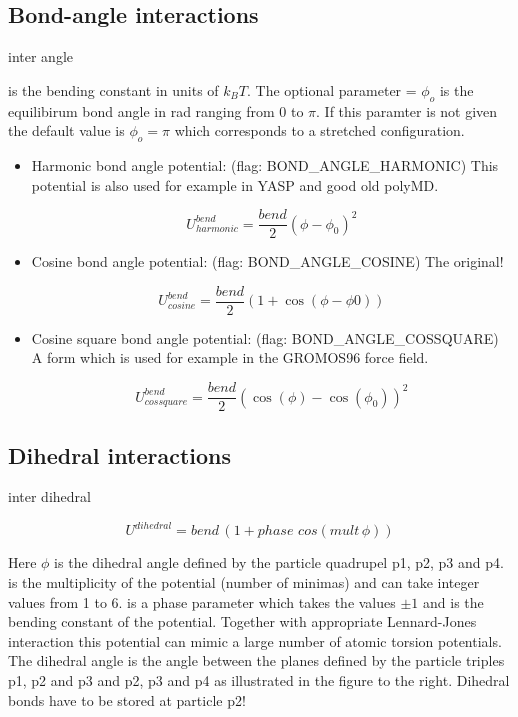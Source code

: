 \subsection{Bond-angle interactions}

\begin{essyntax}
  inter  
  angle  
\end{essyntax}

 is the bending constant in units of $k_BT$. The optional
parameter  = $ \phi_o $ is the equilibirum bond angle in rad
ranging from 0 to $ \pi $. If this paramter is not given the default
value is $ \phi_o = \pi $ which corresponds to a stretched
configuration.

\begin{itemize}
\item Harmonic bond angle potential: (flag: BOND_ANGLE_HARMONIC)
  This potential is also used for example in YASP and good old polyMD.

      \[ U^{bend}_{harmonic} = \frac{bend}{2} (\phi - \phi_0)^2 \]

    \item Cosine bond angle potential: (flag: BOND_ANGLE_COSINE) The
      \es{} original!

      \[ U^{bend}_{cosine} = \frac{bend}{2} (1 + \cos(\phi - \phi0)) \]

    \item Cosine square bond angle potential: (flag:
      BOND_ANGLE_COSSQUARE) A form which is used for example in the
      GROMOS96 force field.

      \[ U^{bend}_{cossquare} = \frac{bend}{2} (\cos(\phi) - \cos(\phi_0))^2 \] 
\end{itemize}

\subsection{Dihedral interactions}

\begin{essyntax}
  inter  
  dihedral   
\end{essyntax}

\[ U^{dihedral} = bend \, (1 + phase \, \, cos(mult \, \phi)) \]

Here $\phi$ is the dihedral angle defined by the particle quadrupel
p1, p2, p3 and p4.  is the multiplicity of the potential
(number of minimas) and can take integer values from 1 to 6.
 is a phase parameter which takes the values $\pm1$ and
 is the bending constant of the potential. Together with
appropriate Lennard-Jones interaction this potential can mimic a large
number of atomic torsion potentials. The dihedral angle is the angle
between the planes defined by the particle triples p1, p2 and p3 and
p2, p3 and p4 as illustrated in the figure to the right. Dihedral
bonds have to be stored at particle p2!


